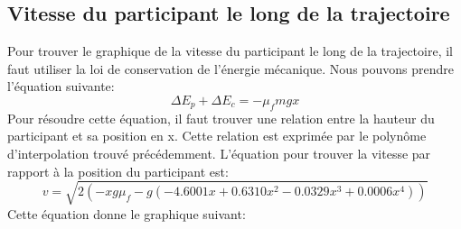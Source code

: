 \documentclass{article}
\begin{document}
\subsection{Vitesse du participant le long de la trajectoire}
Pour trouver le graphique de la vitesse du participant le long de la trajectoire, il faut utiliser la loi de conservation de l'énergie mécanique. Nous pouvons prendre l'équation suivante:
\begin{equation}
	\Delta E_p + \Delta E_c = -\mu_fmgx
\end{equation}
Pour résoudre cette équation, il faut trouver une relation entre la hauteur du participant et sa position en x. Cette relation est exprimée par le polynôme d'interpolation trouvé précédemment. L'équation pour trouver la vitesse par rapport à la position du participant est:
\begin{equation}
	v = \sqrt{2(-xg\mu_f-g(-4.6001x+0.6310x^2-0.0329x^3+0.0006x^4))}
\end{equation}
Cette équation donne le graphique suivant:
\begin{center}
\end{center}
\end{document}
